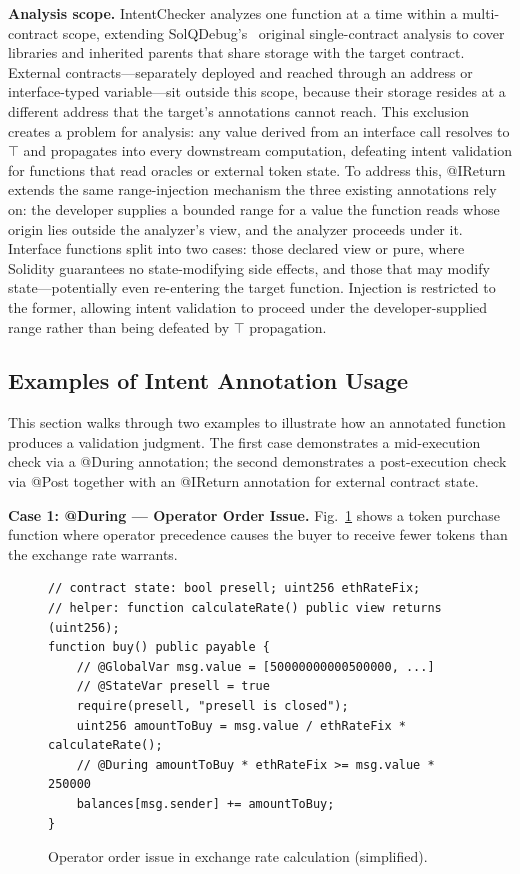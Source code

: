 \documentclass[pdflatex,sn-basic]{sn-jnl}%
\theoremstyle{thmstyleone}%
\theoremstyle{thmstyletwo}%
\theoremstyle{thmstylethree}%
\begin{document}
\smallskip
\noindent\textbf{Analysis scope.}
IntentChecker analyzes one function at a time within a multi-contract scope, extending SolQDebug's~\citep{solqdebug} original single-contract analysis to cover libraries and inherited parents that share storage with the target contract. External contracts---separately deployed and reached through an address or interface-typed variable---sit outside this scope, because their storage resides at a different address that the target's annotations cannot reach.
This exclusion creates a problem for analysis: any value derived from an interface call resolves to $\top$ and propagates into every downstream computation, defeating intent validation for functions that read oracles or external token state. To address this, @IReturn extends the same range-injection mechanism the three existing annotations rely on: the developer supplies a bounded range for a value the function reads whose origin lies outside the analyzer's view, and the analyzer proceeds under it. Interface functions split into two cases: those declared view or pure, where Solidity guarantees no state-modifying side effects, and those that may modify state---potentially even re-entering the target function. Injection is restricted to the former, allowing intent validation to proceed under the developer-supplied range rather than being defeated by $\top$ propagation.

\subsection{Examples of Intent Annotation Usage}

This section walks through two examples to illustrate how an annotated function produces a validation judgment.
The first case demonstrates a mid-execution check via a @During annotation; the second demonstrates a post-execution check via @Post together with an @IReturn annotation for external contract state.

\smallskip
\noindent\textbf{Case 1: @During --- Operator Order Issue.}
Fig.~\ref{fig:operator-order-example} shows a token purchase function where operator precedence causes the buyer to receive fewer tokens than the exchange rate warrants.

\begin{figure}[t]
\begin{lstlisting}
// contract state: bool presell; uint256 ethRateFix;
// helper: function calculateRate() public view returns (uint256);
function buy() public payable {
    // @GlobalVar msg.value = [50000000000500000, ...]
    // @StateVar presell = true
    require(presell, "presell is closed");
    uint256 amountToBuy = msg.value / ethRateFix * calculateRate();
    // @During amountToBuy * ethRateFix >= msg.value * 250000
    balances[msg.sender] += amountToBuy;
}
\end{lstlisting}
\caption{Operator order issue in exchange rate calculation (simplified).}
\label{fig:operator-order-example}
\end{figure}
\end{document}
